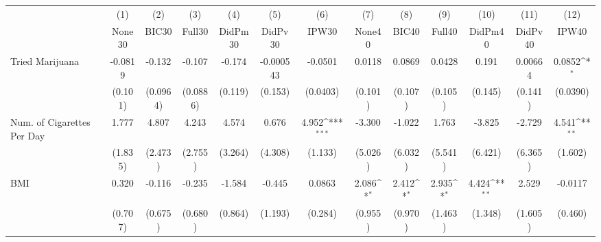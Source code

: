 {
\def\sym#1{\ifmmode^{#1}\else\(^{#1}\)\fi}
\begin{tabular}{l*{12}{c}}
\toprule
            &\multicolumn{1}{c}{(1)}&\multicolumn{1}{c}{(2)}&\multicolumn{1}{c}{(3)}&\multicolumn{1}{c}{(4)}&\multicolumn{1}{c}{(5)}&\multicolumn{1}{c}{(6)}&\multicolumn{1}{c}{(7)}&\multicolumn{1}{c}{(8)}&\multicolumn{1}{c}{(9)}&\multicolumn{1}{c}{(10)}&\multicolumn{1}{c}{(11)}&\multicolumn{1}{c}{(12)}\\
            &\multicolumn{1}{c}{None30}&\multicolumn{1}{c}{BIC30}&\multicolumn{1}{c}{Full30}&\multicolumn{1}{c}{DidPm30}&\multicolumn{1}{c}{DidPv30}&\multicolumn{1}{c}{IPW30}&\multicolumn{1}{c}{None40}&\multicolumn{1}{c}{BIC40}&\multicolumn{1}{c}{Full40}&\multicolumn{1}{c}{DidPm40}&\multicolumn{1}{c}{DidPv40}&\multicolumn{1}{c}{IPW40}\\
\midrule
Tried Marijuana&     -0.0819         &      -0.132         &      -0.107         &      -0.174         &   -0.000543         &     -0.0501         &      0.0118         &      0.0869         &      0.0428         &       0.191         &     0.00664         &      0.0852\sym{*}  \\
            &     (0.101)         &    (0.0964)         &    (0.0886)         &     (0.119)         &     (0.153)         &    (0.0403)         &     (0.101)         &     (0.107)         &     (0.105)         &     (0.145)         &     (0.141)         &    (0.0390)         \\
\addlinespace
Num. of Cigarettes Per Day&       1.777         &       4.807         &       4.243         &       4.574         &       0.676         &       4.952\sym{***}&      -3.300         &      -1.022         &       1.763         &      -3.825         &      -2.729         &       4.541\sym{**} \\
            &     (1.835)         &     (2.473)         &     (2.755)         &     (3.264)         &     (4.308)         &     (1.133)         &     (5.026)         &     (6.032)         &     (5.541)         &     (6.421)         &     (6.365)         &     (1.602)         \\
\addlinespace
BMI         &       0.320         &      -0.116         &      -0.235         &      -1.584         &      -0.445         &      0.0863         &       2.086\sym{*}  &       2.412\sym{*}  &       2.935\sym{*}  &       4.424\sym{**} &       2.529         &     -0.0117         \\
            &     (0.707)         &     (0.675)         &     (0.680)         &     (0.864)         &     (1.193)         &     (0.284)         &     (0.955)         &     (0.970)         &     (1.463)         &     (1.348)         &     (1.605)         &     (0.460)         \\

\end{tabular}}
